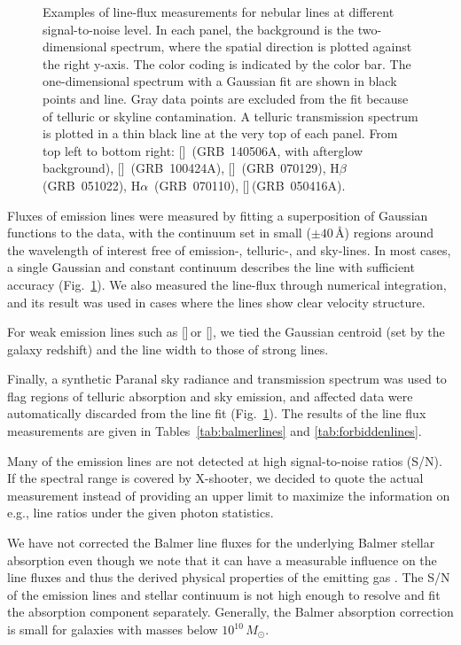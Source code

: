 \documentclass[traditabstract, longauth]{aa}
\newcommand{\hb}{H$\beta$}
\newcommand{\ha}{H$\alpha$}
\newcommand{\oii}{[\ion{O}{ii}]}
\newcommand{\oiii}{[\ion{O}{iii}]}
\newcommand{\neiii}{[\ion{Ne}{iii}]}
\newcommand{\nii}{[\ion{N}{ii}]}
\newcommand{\Msun}{$M_\odot$}
\begin{document}
\begin{figure}
\begin{subfigure}{.33\textwidth}
\end{subfigure}
\caption{ {Examples of line-flux measurements for nebular lines at different signal-to-noise level. In each panel, the background is the two-dimensional spectrum, where the spatial direction is plotted against the right y-axis. The color coding is indicated by the color bar. The one-dimensional spectrum with a Gaussian fit are shown in black points and line. Gray data points are excluded from the fit because of telluric or skyline contamination. A telluric transmission spectrum is plotted in a thin black line at the very top of each panel. From top left to bottom right: \oii\, (GRB~140506A, with afterglow background), \neiii\, (GRB~100424A), \oiii\, (GRB~070129), \hb\, (GRB~051022), \ha\, (GRB~070110), \nii\,(GRB~050416A).}}
\label{fig:lineexamples}
\end{figure}

Fluxes of emission lines were measured by fitting a superposition of Gaussian functions to the data, with the continuum set in small ($\pm40$\,\AA) regions around the wavelength of interest free of emission-, telluric-, and sky-lines. In most cases, a single Gaussian and constant continuum describes the line with sufficient accuracy (Fig.~\ref{fig:lineexamples}). We also measured the line-flux through numerical integration, and its result was used in cases where the lines show clear velocity structure.

For weak emission lines such as \neiii\,or \nii, we tied the Gaussian centroid (set by the galaxy redshift) and the line width to those of strong lines. 

Finally, a synthetic Paranal sky radiance and transmission spectrum \citep{2012A&A...543A..92N} was used to flag regions of telluric absorption and sky emission, and affected data were automatically discarded from the line fit (Fig.~\ref{fig:lineexamples}). The results of the line flux measurements are given in Tables~\ref{tab:balmerlines} and \ref{tab:forbiddenlines}. 

Many of the emission lines are not detected at high signal-to-noise ratios (S/N). If the spectral range is covered by X-shooter, we decided to quote the actual measurement instead of providing an upper limit to maximize the information on e.g., line ratios under the given photon statistics.




We have not corrected the Balmer line fluxes for the underlying Balmer stellar absorption even though we note that it can have a measurable influence on the line fluxes and thus the derived physical properties of the emitting gas \citep{2011MNRAS.414.2793W}. The S/N of the emission lines and stellar continuum is not high enough to resolve and fit the absorption component separately. Generally, the Balmer absorption correction is small for galaxies with masses below $10^{10}$\,\Msun. 
\end{document}
